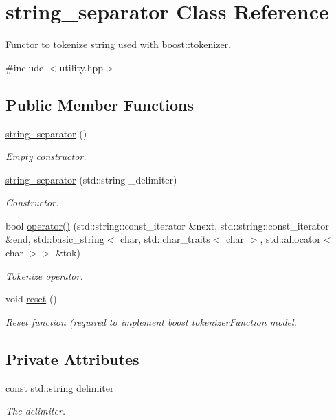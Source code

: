 \hypertarget{classstring__separator}{}\section{string\+\_\+separator Class Reference}
\label{classstring__separator}


Functor to tokenize string used with boost\+::tokenizer.  




{\ttfamily \#include $<$utility.\+hpp$>$}

\subsection*{Public Member Functions}
\begin{DoxyCompactItemize}
\item 
\hyperlink{classstring__separator_ad337bb516414fe7a759aba7bbd7fe57e}{string\+\_\+separator} ()
\begin{DoxyCompactList}\small\item\em Empty constructor. \end{DoxyCompactList}\item 
\hyperlink{classstring__separator_abf0db07e243f7b35acc759707463b88d}{string\+\_\+separator} (std\+::string \+\_\+delimiter)
\begin{DoxyCompactList}\small\item\em Constructor. \end{DoxyCompactList}\item 
bool \hyperlink{classstring__separator_a9255a2ce916538d77414f2971c0a7756}{operator()} (std\+::string\+::const\+\_\+iterator \&next, std\+::string\+::const\+\_\+iterator \&end, std\+::basic\+\_\+string$<$ char, std\+::char\+\_\+traits$<$ char $>$, std\+::allocator$<$ char $>$$>$ \&tok)
\begin{DoxyCompactList}\small\item\em Tokenize operator. \end{DoxyCompactList}\item 
void \hyperlink{classstring__separator_aae8603394fe99c8426623e899f334c4d}{reset} ()
\begin{DoxyCompactList}\small\item\em Reset function (required to implement boost tokenizer\+Function model. \end{DoxyCompactList}\end{DoxyCompactItemize}
\subsection*{Private Attributes}
\begin{DoxyCompactItemize}
\item 
const std\+::string \hyperlink{classstring__separator_afaeeb0c2ca4249ec4a7a7f2bfcb971cf}{delimiter}
\begin{DoxyCompactList}\small\item\em The delimiter. \end{DoxyCompactList}\end{DoxyCompactItemize}


